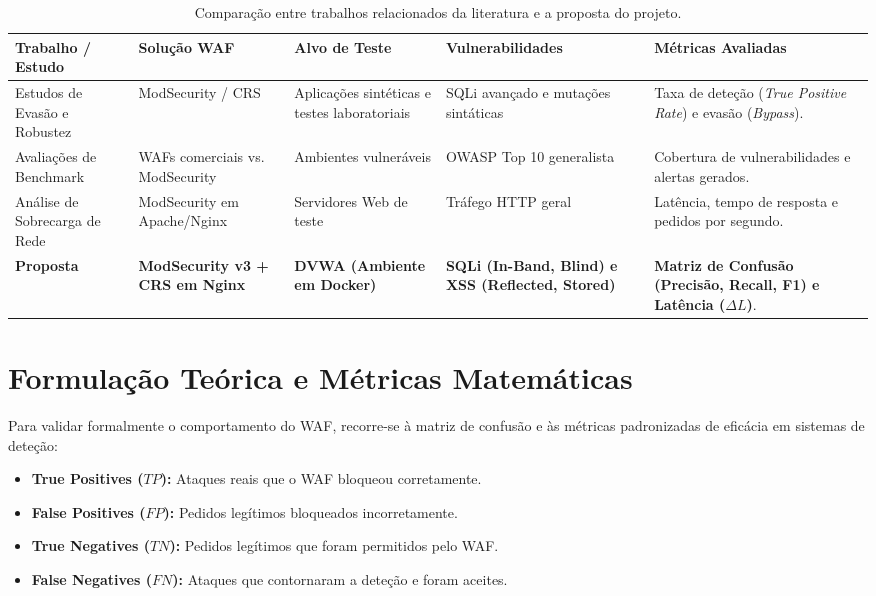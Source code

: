 \documentclass[11pt,a4paper]{article}
\begin{document}
\begin{table}[h!]
\centering
\footnotesize
\setlength{\tabcolsep}{4pt}
\caption{Comparação entre trabalhos relacionados da literatura e a proposta do projeto.}
\label{tab:trabalhos_relacionados}
\begin{tabularx}{\textwidth}{>{\raggedright\arraybackslash}p{2.3cm} >{\raggedright\arraybackslash}p{2.2cm} >{\raggedright\arraybackslash}p{2.0cm} >{\raggedright\arraybackslash}X >{\raggedright\arraybackslash}X}
\toprule
\textbf{Trabalho / Estudo} & \textbf{Solução WAF} & \textbf{Alvo de Teste} & \textbf{Vulnerabilidades} & \textbf{Métricas Avaliadas} \\
\midrule
Estudos de Evasão e Robustez & ModSecurity / CRS & Aplicações sintéticas e testes laboratoriais & SQLi avançado e mutações sintáticas & Taxa de deteção (\textit{True Positive Rate}) e evasão (\textit{Bypass}). \\
\addlinespace
Avaliações de Benchmark & WAFs comerciais vs. ModSecurity & Ambientes vulneráveis & OWASP Top 10 generalista & Cobertura de vulnerabilidades e alertas gerados. \\
\addlinespace
Análise de Sobrecarga de Rede & ModSecurity em Apache/Nginx & Servidores Web de teste & Tráfego HTTP geral & Latência, tempo de resposta e pedidos por segundo. \\
\addlinespace
\textbf{Proposta} & \textbf{ModSecurity v3 + CRS em Nginx} & \textbf{DVWA (Ambiente em Docker)} & \textbf{SQLi (In-Band, Blind) e XSS (Reflected, Stored)} & \textbf{Matriz de Confusão (Precisão, Recall, F1) e Latência ($\Delta L$)}. \\
\bottomrule
\end{tabularx}
\end{table}

\clearpage
\section{Formulação Teórica e Métricas Matemáticas}
\label{sec:modelo}

Para validar formalmente o comportamento do WAF, recorre-se à matriz de confusão e às métricas padronizadas de eficácia em sistemas de deteção:
\begin{itemize}
    \item \textbf{True Positives ($TP$):} Ataques reais que o WAF bloqueou corretamente.
    \item \textbf{False Positives ($FP$):} Pedidos legítimos bloqueados incorretamente.
    \item \textbf{True Negatives ($TN$):} Pedidos legítimos que foram permitidos pelo WAF.
    \item \textbf{False Negatives ($FN$):} Ataques que contornaram a deteção e foram aceites.
\end{itemize}
\end{document}

